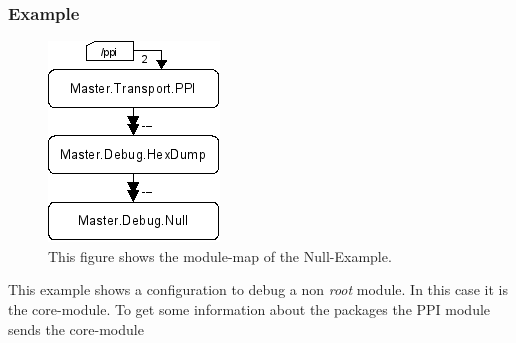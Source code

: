\subsubsection{Example}
\begin{figure}[ht]
    \label{fig:coremod09}
    \centering
    \includegraphics{coremod09.png}
    \caption{This figure shows the module-map of the Null-Example.}
\end{figure}    
This example shows a configuration to debug a non \emph{root} module. In this 
case it is the  core-module. To get some 
information about the packages the PPI module sends the core-module 
